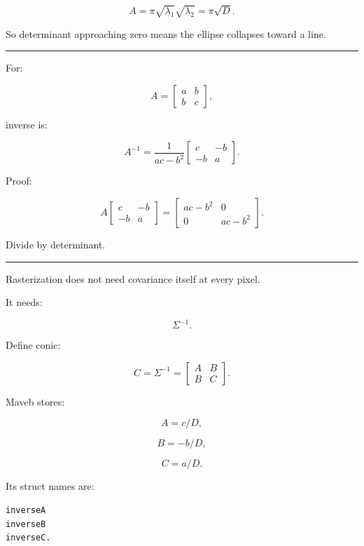 \[
A=
\pi
\sqrt{\lambda_1}
\sqrt{\lambda_2}
=
\boxed{
\pi\sqrt{D}.
}
\]

So determinant approaching zero means the ellipse collapses toward a line.

\begin{center}\rule{0.5\linewidth}{0.5pt}\end{center}

For:

\[
A=
\begin{bmatrix}
a&b\\
b&c
\end{bmatrix},
\]

inverse is:

\[
\boxed{
A^{-1}
=
\frac1{ac-b^2}
\begin{bmatrix}
c&-b\\
-b&a
\end{bmatrix}.
}
\]

Proof:

\[
A
\begin{bmatrix}
c&-b\\
-b&a
\end{bmatrix}
=
\begin{bmatrix}
ac-b^2&0\\
0&ac-b^2
\end{bmatrix}.
\]

Divide by determinant.

\begin{center}\rule{0.5\linewidth}{0.5pt}\end{center}

Rasterization does not need covariance itself at every pixel.

It needs:

\[
\Sigma^{-1}.
\]

Define conic:

\[
C=
\Sigma^{-1}
=
\begin{bmatrix}
A&B\\
B&C
\end{bmatrix}.
\]

Maveb stores:

\[
A=
c/D,
\]

\[
B=
-b/D,
\]

\[
C=
a/D.
\]

Its struct names are:

\protect{}\label{cgxb8q}%
\begin{verbatim}
inverseA
inverseB
inverseC.
\end{verbatim}

